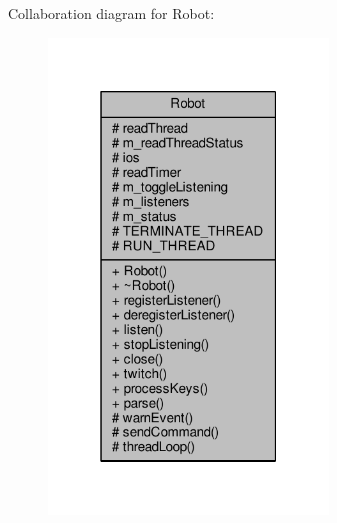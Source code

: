Collaboration diagram for Robot\+:
\nopagebreak
\begin{figure}[H]
\begin{center}
\leavevmode
\includegraphics[width=211pt]{class_robot__coll__graph}
\end{center}
\end{figure}
